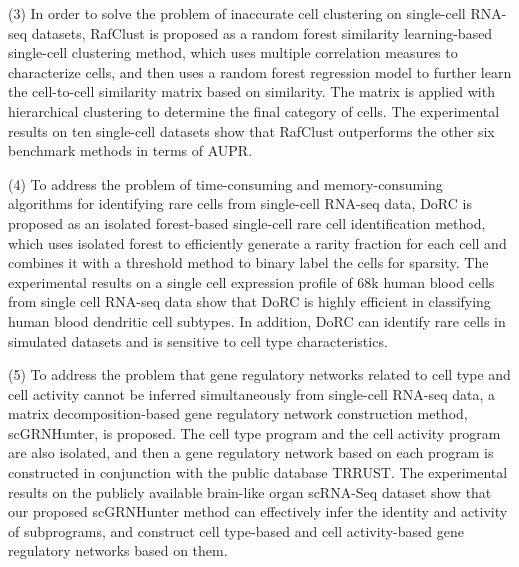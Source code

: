 \begin{abstracten}
(3) In order to solve the problem of inaccurate cell clustering on single-cell RNA-seq datasets, 
RafClust is proposed as a random forest similarity learning-based single-cell clustering method, 
which uses multiple correlation measures to characterize cells, 
and then uses a random forest regression model to further learn the cell-to-cell similarity matrix based on similarity. 
The matrix is applied with hierarchical clustering to determine the final category of cells. 
The experimental results on ten single-cell datasets show that RafClust outperforms the other six benchmark methods in terms of AUPR.

(4) To address the problem of time-consuming and memory-consuming algorithms for identifying rare cells from single-cell RNA-seq data, 
DoRC is proposed as an isolated forest-based single-cell rare cell identification method, 
which uses isolated forest to efficiently generate a rarity fraction for each cell and combines it with a threshold method to binary label the cells for sparsity. 
The experimental results on a single cell expression profile of 68k human blood cells from single cell RNA-seq data show that DoRC is highly efficient in classifying human blood dendritic cell subtypes. 
In addition, DoRC can identify rare cells in simulated datasets and is sensitive to cell type characteristics.

(5) To address the problem that gene regulatory networks related to cell type and cell activity cannot be inferred simultaneously from single-cell RNA-seq data, 
a matrix decomposition-based gene regulatory network construction method, scGRNHunter, is proposed. 
The cell type program and the cell activity program are also isolated, and then a gene regulatory network based on each program is constructed in conjunction with the public database TRRUST. 
The experimental results on the publicly available brain-like organ scRNA-Seq dataset show that our proposed scGRNHunter method can effectively infer the identity and activity of subprograms, 
and construct cell type-based and cell activity-based gene regulatory networks based on them.


\end{abstracten}